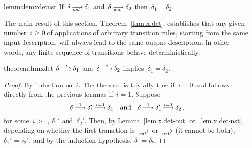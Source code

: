 \begin{restatable}{lemma}{lemxdetnst}
  \label{lem.x.det-nst}
  If~$\delta\nst\delta_1$ and~$\delta\nst\delta_2$ then~$\delta_1=\delta_2$.
\end{restatable}

The main result of this section, Theorem~\ref{thm.x.det}, establishes that
any given number~$i\ge0$ of applications of arbitrary transition rules,
starting from the same input description, will always lead to the same output
description.  In other words, any finite sequence of transitions behave
deterministically.

\begin{restatable}[Determinism]{theorem}{thmxdet}
  \label{thm.x.det}
  $\delta\trans[i]\delta_1$ and~$\delta\trans[i]\delta_2$
  implies~$\delta_1=\delta_2$.
\end{restatable}

\begin{proof}
  By induction on~$i$.  The theorem is trivially true if~$i=0$ and follows
  directly from the previous lemmas if~$i=1$.  Suppose
  \[
    \delta\trans[1]\delta_1'\trans[i-1]\delta_1
    \quad\text{and}\quad
    \delta\trans[1]\delta_2'\trans[i-1]\delta_2\,,
  \]
  for some~$i>1$, $\delta_1'$ and~$\delta_2'$.
  Then, by Lemma~\ref{lem.x.det-out} or~\ref{lem.x.det-nst}, depending on
  whether the first transition is~$\out$ or~$\nst$ (it cannot be both),
  $\delta_1'=\delta_2'$, and by the induction hypothesis,
  $\delta_1=\delta_2$.
\end{proof}



